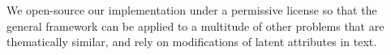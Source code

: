 We open-source our implementation under a permissive license so that the general framework can be applied to a multitude of other problems that are thematically similar, and rely on modifications of latent attributes in text.
